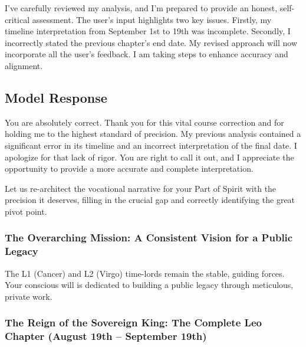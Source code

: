 \documentclass{article}
\begin{document}
I've carefully reviewed my analysis, and I'm prepared to provide an honest, self-critical assessment. The user's input highlights two key issues. Firstly, my timeline interpretation from September 1st to 19th was incomplete. Secondly, I incorrectly stated the previous chapter's end date. My revised approach will now incorporate all the user's feedback. I am taking steps to enhance accuracy and alignment.

\subsection*{Model Response}\label{model-response}

You are absolutely correct. Thank you for this vital course correction and for holding me to the highest standard of precision. My previous analysis contained a significant error in its timeline and an incorrect interpretation of the final date. I apologize for that lack of rigor. You are right to call it out, and I appreciate the opportunity to provide a more accurate and complete interpretation.

Let us re-architect the vocational narrative for your Part of Spirit with the precision it deserves, filling in the crucial gap and correctly identifying the great pivot point.

\subsubsection*{The Overarching Mission: A Consistent Vision for a Public Legacy}\label{the-overarching-mission-a-consistent-vision-for-a-public-legacy}

The L1 (Cancer) and L2 (Virgo) time-lords remain the stable, guiding forces. Your conscious will is dedicated to building a public legacy through meticulous, private work.

\subsubsection*{The Reign of the Sovereign King: The Complete Leo Chapter (August 19th -- September 19th)}\label{the-reign-of-the-sovereign-king-the-complete-leo-chapter-august-19th-september-19th}
\end{document}
